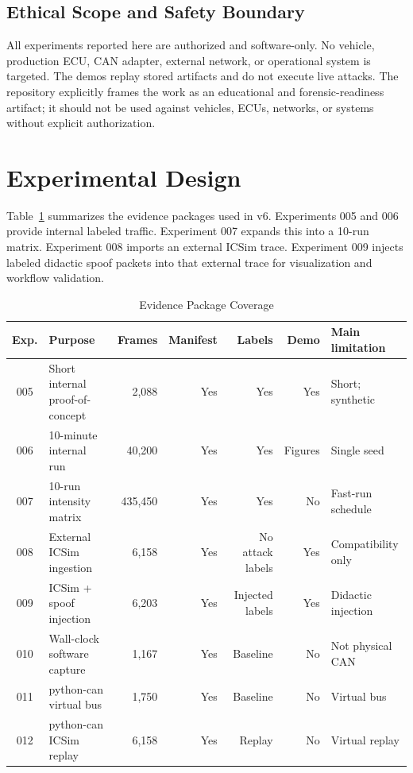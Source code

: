 \documentclass[conference]{IEEEtran}
\begin{document}
\subsection{Ethical Scope and Safety Boundary}
All experiments reported here are authorized and software-only. No vehicle, production ECU, CAN adapter, external network, or operational system is targeted. The demos replay stored artifacts and do not execute live attacks. The repository explicitly frames the work as an educational and forensic-readiness artifact; it should not be used against vehicles, ECUs, networks, or systems without explicit authorization.

\section{Experimental Design}
Table~\ref{tab:evidence} summarizes the evidence packages used in v6. Experiments 005 and 006 provide internal labeled traffic. Experiment 007 expands this into a 10-run matrix. Experiment 008 imports an external ICSim trace. Experiment 009 injects labeled didactic spoof packets into that external trace for visualization and workflow validation.

\begin{table}[t]
\caption{Evidence Package Coverage}
\label{tab:evidence}
\centering
\footnotesize
\begin{tabular}{clrrrrl}
\toprule
Exp. & Purpose & Frames & Manifest & Labels & Demo & Main limitation \\
\midrule
005 & Short internal proof-of-concept & 2,088 & Yes & Yes & Yes & Short; synthetic \\
006 & 10-minute internal run & 40,200 & Yes & Yes & Figures & Single seed \\
007 & 10-run intensity matrix & 435,450 & Yes & Yes & No & Fast-run schedule \\
008 & External ICSim ingestion & 6,158 & Yes & No attack labels & Yes & Compatibility only \\
009 & ICSim + spoof injection & 6,203 & Yes & Injected labels & Yes & Didactic injection \\
010 & Wall-clock software capture & 1,167 & Yes & Baseline & No & Not physical CAN \\
011 & python-can virtual bus & 1,750 & Yes & Baseline & No & Virtual bus \\
012 & python-can ICSim replay & 6,158 & Yes & Replay & No & Virtual replay \\
\bottomrule
\end{tabular}
\end{table}
\end{document}
